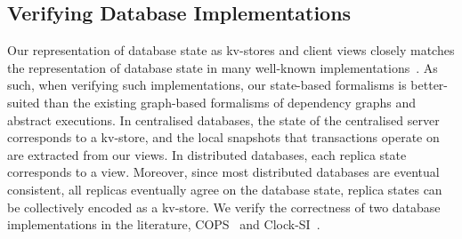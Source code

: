 \subsection{Verifying Database Implementations}
\label{sec:verify-impl}
%
Our representation of database state as kv-stores and client views closely matches the representation of database state in many well-known implementations~\cite{ramp,rola,cops,wren,redblue,PSI,NMSI,gdur,clocksi,distrsi}.
As such, when verifying such implementations, our state-based formalisms is better-suited than the existing graph-based formalisms of dependency graphs and abstract executions. 
In centralised databases, the state of the centralised server corresponds to a kv-store,
and the local snapshots that transactions operate on are extracted from our views.  
In distributed databases, each replica state corresponds to a view. 
Moreover, since most distributed databases are eventual consistent, 
\ie all replicas eventually agree on the database state,
replica states can be collectively encoded as a kv-store.
We verify the correctness of two database implementations in the literature,
COPS~\cite{cops} and Clock-SI~\cite{clock-si}.

